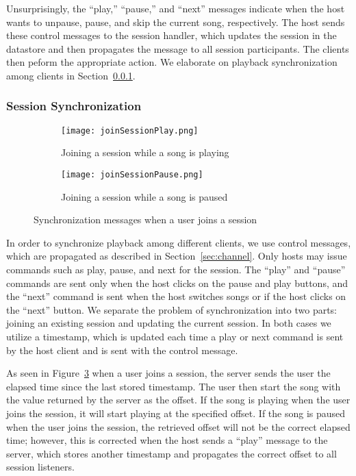 Unsurprisingly, the ``play,'' ``pause,'' and ``next'' messages 
indicate when the host wants to unpause, pause, and skip the current song, respectively.
The host sends these control messages to the session handler, which updates
the session in the datastore and then propagates the message to all session
participants. The clients then peform the appropriate action. We elaborate on
playback synchronization among clients in Section~\ref{sec:sync}.

\subsubsection{Session Synchronization}
\label{sec:sync}

\begin{figure}[t!]
	\centering
	\begin{subfigure}[b]{0.5\textwidth}
		\centering
		\texttt{[image: joinSessionPlay.png]}
		\caption{Joining a session while a song is playing}
		\label{fig:syncJoinPlay}
	\end{subfigure}
	
	\begin{subfigure}[b]{0.5\textwidth}
		\centering
		\texttt{[image: joinSessionPause.png]}
		\caption{Joining a session while a song is paused}
		\label{fig:syncJoinPause}
	\end{subfigure}
	\caption{Synchronization messages when a user joins a session}
	\label{fig:syncJoin}
\end{figure}

In order to synchronize playback among different clients, we use 
control messages, which are propagated as described in Section~\ref{sec:channel}. 
Only hosts may issue commands such as play, pause, and 
next for the session. The ``play'' and ``pause'' commands are sent
only when the host clicks on the pause and play buttons, and the 
``next'' command is sent when the host switches songs or if the
host clicks on the ``next'' button. We separate the problem of synchronization 
into two parts: joining an existing session and updating the
current session. In both cases we utilize a timestamp, which is 
updated each time a play or next command is sent by the host client
and is sent with the control message. 

As seen in Figure~\ref{fig:syncJoin} when a user joins a session, 
the server sends the user the elapsed time since the last stored timestamp. 
The user then start the song with the value returned by the server as 
the offset. If the song is playing when the user joins the session, 
it will start playing at the specified offset. If the song is paused when 
the user joins the session, the retrieved offset will not be the correct 
elapsed time; however, this is corrected when the host sends a ``play'' 
message to the server, which stores another timestamp and propagates
the correct offset to all session listeners.

